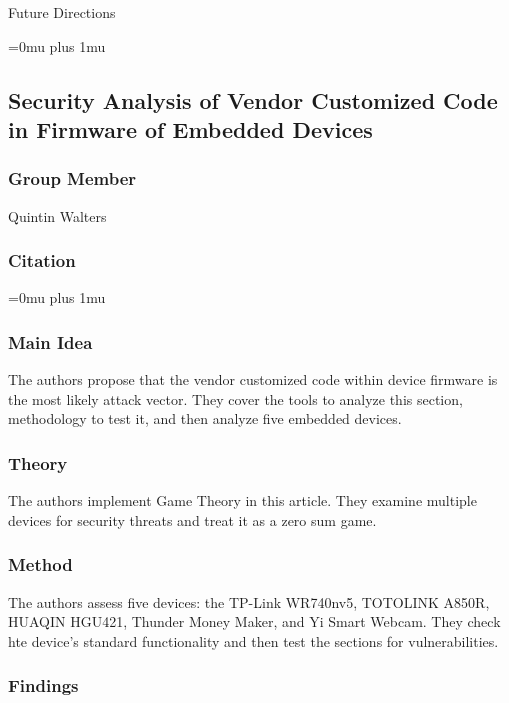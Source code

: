 \noindent
Future Directions 

\Urlmuskip=0mu plus 1mu\relax

\noindent
\subsection{Security Analysis of Vendor Customized Code in Firmware of Embedded Devices}

\subsubsection{Group Member}

\noindent
Quintin Walters

\noindent
\subsubsection{Citation}

\Urlmuskip=0mu plus 1mu\relax

\subsubsection{Main Idea}

\noindent
The authors propose that the vendor customized code within device firmware is the most likely attack vector.  They cover the tools to analyze this section, methodology to test it, and then analyze five embedded devices.

\subsubsection{Theory}

\noindent
The authors implement Game Theory in this article.  They examine multiple devices for security threats and treat it as a zero sum game.

\subsubsection{Method}

\noindent
The authors assess five devices: the TP-Link WR740nv5, TOTOLINK A850R, HUAQIN HGU421, Thunder Money Maker, and Yi Smart Webcam.  They check hte device's standard functionality and then test the sections for vulnerabilities.

\subsubsection{Findings}

